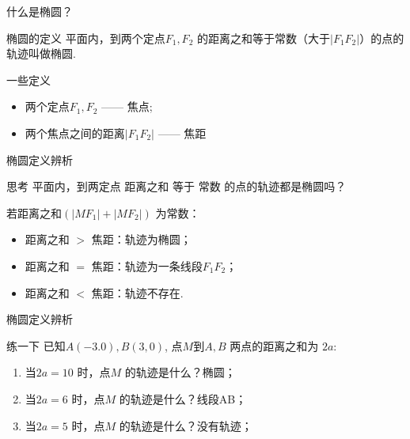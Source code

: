 \documentclass{beamer}
\begin{document}
    \begin{frame}{\qquad 什么是椭圆？}
      \begin{alertblock}{椭圆的定义}
        平面内，到\alert{两个定点}$F_1, F_2$ \pause 的\alert{距离之和}\pause 等于\alert{常数}\pause \textcolor{rh}{（大于$|F_1F_2|$）}\pause 的点的轨迹叫做椭圆. \pause
      \end{alertblock}
      \begin{block}{一些定义}
        \begin{itemize}
          \item 两个定点$F_1, F_2$ —— \textcolor{ln}{焦点}; \pause
          \item 两个焦点之间的距离$|F_1F_2|$ —— \textcolor{ln}{焦距} \pause
        \end{itemize}
      \end{block}
    \end{frame}

    \begin{frame}{\qquad 椭圆定义辨析}
      \begin{block}{思考}
        平面内，到\textcolor{rh}{两定点} \alert{距离之和} 等于 \alert{常数} 的点的轨迹都是\alert{椭圆}吗？
      \end{block} \pause
      \vspace{10pt}
      若距离之和$(|MF_1| + |MF_2|)$ 为常数：\pause
      \vspace{10pt}
      \begin{itemize}
        \item 距离之和 \alert{$>$} 焦距：\pause 轨迹为\alert{椭圆}；\pause
        \item 距离之和 \alert{$=$} 焦距：\pause 轨迹为一条\alert{线段$F_1F_2$}；\pause
        \item 距离之和 \alert{$<$} 焦距：\pause 轨迹\alert{不存在}.
      \end{itemize}
    \end{frame}

    \begin{frame}{\qquad 椭圆定义辨析}
      \begin{block}{练一下}
        已知$A(-3.0), B(3,0)$, 点$M$到$A, B$ 两点的距离之和为 $2a$:
        \begin{enumerate}
          \item 当$2a=10$ 时，点$M$ 的轨迹是什么？\pause \alert{椭圆}；
          \item 当$2a=6$ 时，点$M$ 的轨迹是什么？\pause \alert{线段AB}；
          \item 当$2a=5$ 时，点$M$ 的轨迹是什么？\pause \alert{没有轨迹}；
        \end{enumerate}
      \end{block}
    \end{frame}
\end{document}
